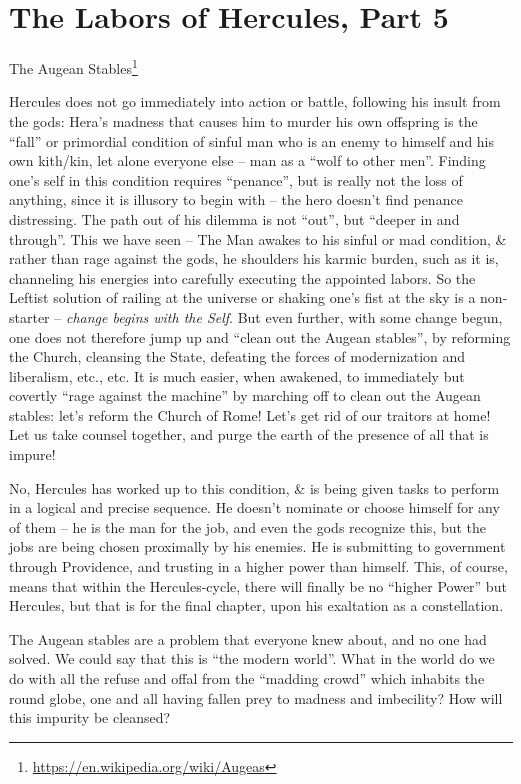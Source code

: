 \section{The Labors of Hercules, Part 5}

The Augean Stables\footnote{\url{https://en.wikipedia.org/wiki/Augeas}}

Hercules does not go immediately into action or battle, following his insult from the gods: Hera's madness that causes him to murder his own offspring is the ``fall'' or primordial condition of sinful man who is an enemy to himself and his own kith/kin, let alone everyone else -- man as a ``wolf to other men''. Finding one's self in this condition requires ``penance'', but is really not the loss of anything, since it is illusory to begin with -- the hero doesn't find penance distressing. The path out of his dilemma is not ``out'', but ``deeper in and through''. This we have seen -- The Man awakes to his sinful or mad condition, \& rather than rage against the gods, he shoulders his karmic burden, such as it is, channeling his energies into carefully executing the appointed labors. So the Leftist solution of railing at the universe or shaking one's fist at the sky is a non-starter -- \emph{change begins with the Self}. But even further, with some change begun, one does not therefore jump up and ``clean out the Augean stables'', by reforming the Church, cleansing the State, defeating the forces of modernization and liberalism, etc., etc. It is much easier, when awakened, to immediately but covertly ``rage against the machine'' by marching off to clean out the Augean stables: let's reform the Church of Rome! Let's get rid of our traitors at home! Let us take counsel together, and purge the earth of the presence of all that is impure!

No, Hercules has worked up to this condition, \& is being given tasks to perform in a logical and precise sequence. He doesn't nominate or choose himself for any of them -- he is the man for the job, and even the gods recognize this, but the jobs are being chosen proximally by his enemies. He is submitting to government through Providence, and trusting in a higher power than himself. This, of course, means that within the Hercules-cycle, there will finally be no ``higher Power'' but Hercules, but that is for the final chapter, upon his exaltation as a constellation.

The Augean stables are a problem that everyone knew about, and no one had solved. We could say that this is ``the modern world''. What in the world do we do with all the refuse and offal from the ``madding crowd'' which inhabits the round globe, one and all having fallen prey to madness and imbecility? How will this impurity be cleansed?

